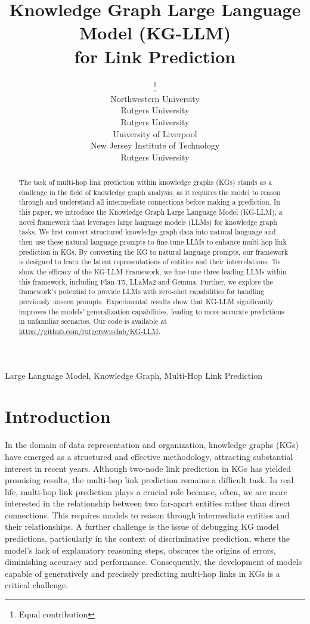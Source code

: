 \documentclass[pmlr]{jmlr}%
\title[KG-LLM]{Knowledge Graph Large Language Model (KG-LLM) \\ for Link Prediction}
\author{\Name{Dong Shu}\footnote{Equal contribution} \Email{dongshu2024@u.northwestern.edu}\\
 \addr Northwestern University
 \AND
 \Name{Tianle Chen}\footnotemark[1] \Email{tobychen.razxwasatch@outlook.com}\\
\addr Rutgers University
 \AND
 \Name{Mingyu Jin} \Email{mj939@scarletmail.rutgers.edu}\\
\addr Rutgers University
\AND
\Name{Chong Zhang} \Email{pcczc15@gmail.com}\\
\addr University of Liverpool
\AND
\Name{Mengnan Du}  \Email{mengnan.du@njit.edu} \\
\addr New Jersey Institute of Technology
\AND
\Name{Yongfeng Zhang} \Email{yongfeng.zhang@rutgers.edu} \\
\addr Rutgers University
}
\begin{document}
\maketitle

\begin{abstract}
The task of multi-hop link prediction within knowledge graphs (KGs) stands as a challenge in the field of knowledge graph analysis, as it requires the model to reason through and understand all intermediate connections before making a prediction. In this paper, we introduce the Knowledge Graph Large Language Model (KG-LLM), a novel framework that leverages large language models (LLMs) for knowledge graph tasks. We first convert structured knowledge graph data into natural language and then use these natural language prompts to fine-tune LLMs to enhance multi-hop link prediction in KGs. By converting the KG to natural language prompts, our framework is designed to learn the latent representations of entities and their interrelations. To show the efficacy of the KG-LLM Framework, we fine-tune three leading LLMs within this framework, including Flan-T5, LLaMa2 and Gemma. Further, we explore the framework's potential to provide LLMs with zero-shot capabilities for handling previously unseen prompts. Experimental results show that KG-LLM significantly improves the models’ generalization capabilities, leading to more accurate predictions in unfamiliar scenarios. Our code is available at \url{https://github.com/rutgerswiselab/KG-LLM}.

\end{abstract}

\begin{keywords}
Large Language Model, Knowledge Graph, Multi-Hop Link Prediction
\end{keywords}

\section{Introduction}

In the domain of data representation and organization, knowledge graphs (KGs) have emerged as a structured and effective methodology, attracting substantial interest in recent years. Although two-node link prediction in KGs has yielded promising results, the multi-hop link prediction remains a difficult task. In real life, multi-hop link prediction plays a crucial role because, often, we are more interested in the relationship between two far-apart entities rather than direct connections. This requires models to reason through intermediate entities and their relationships. A further challenge is the issue of debugging KG model predictions, particularly in the context of discriminative prediction, where the model's lack of explanatory reasoning steps, obscures the origins of errors, diminishing accuracy and performance. Consequently, the development of models capable of generatively and precisely predicting multi-hop links in KGs is a critical challenge.
\end{document}
